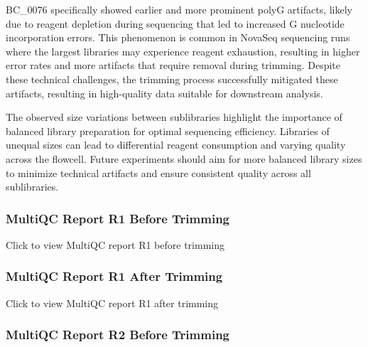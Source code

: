 \documentclass[
  11pt,
  a4paper,
]{report}
\begin{document}
BC\_0076 specifically showed earlier and more prominent polyG artifacts,
likely due to reagent depletion during sequencing that led to increased
G nucleotide incorporation errors. This phenomenon is common in NovaSeq
sequencing runs where the largest libraries may experience reagent
exhaustion, resulting in higher error rates and more artifacts that
require removal during trimming. Despite these technical challenges, the
trimming process successfully mitigated these artifacts, resulting in
high-quality data suitable for downstream analysis.

\begin{tcolorbox}[enhanced jigsaw, arc=.35mm, colbacktitle=quarto-callout-tip-color!10!white, rightrule=.15mm, title=\textcolor{quarto-callout-tip-color}{\faLightbulb}\hspace{0.5em}{Recommendations for Future Experiments}, coltitle=black, bottomrule=.15mm, left=2mm, opacityback=0, colback=white, toprule=.15mm, toptitle=1mm, titlerule=0mm, breakable, bottomtitle=1mm, opacitybacktitle=0.6, colframe=quarto-callout-tip-color-frame, leftrule=.75mm]

The observed size variations between sublibraries highlight the
importance of balanced library preparation for optimal sequencing
efficiency. Libraries of unequal sizes can lead to differential reagent
consumption and varying quality across the flowcell. Future experiments
should aim for more balanced library sizes to minimize technical
artifacts and ensure consistent quality across all sublibraries.

\end{tcolorbox}

\subsubsection{MultiQC Report R1 Before
Trimming}\label{multiqc-report-r1-before-trimming}

Click to view MultiQC report R1 before trimming

\subsubsection{MultiQC Report R1 After
Trimming}\label{multiqc-report-r1-after-trimming}

Click to view MultiQC report R1 after trimming

\subsubsection{MultiQC Report R2 Before
Trimming}\label{multiqc-report-r2-before-trimming}
\end{document}
